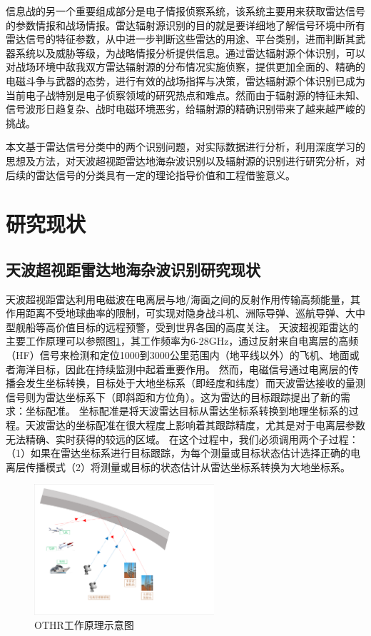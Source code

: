 信息战的另一个重要组成部分是电子情报侦察系统，该系统主要用来获取雷达信号的参数情报和战场情报。雷达辐射源识别的目的就是要详细地了解信号环境中所有雷达信号的特征参数，从中进一步判断这些雷达的用途、平台类别，进而判断其武器系统以及威胁等级，为战略情报分析提供信息。通过雷达辐射源个体识别，可以对战场环境中敌我双方雷达辐射源的分布情况实施侦察，提供更加全面的、精确的电磁斗争与武器的态势，进行有效的战场指挥与决策，雷达辐射源个体识别已成为当前电子战特别是电子侦察领域的研究热点和难点。然而由于辐射源的特征未知、信号波形日趋复杂、战时电磁环境恶劣，给辐射源的精确识别带来了越来越严峻的挑战。

本文基于雷达信号分类中的两个识别问题，对实际数据进行分析，利用深度学习的思想及方法，对天波超视距雷达地海杂波识别以及辐射源的识别进行研究分析，对后续的雷达信号的分类具有一定的理论指导价值和工程借鉴意义。

\section{研究现状}
\subsection{天波超视距雷达地海杂波识别研究现状}
天波超视距雷达利用电磁波在电离层与地/海面之间的反射作用传输高频能量，其作用距离不受地球曲率的限制，可实现对隐身战斗机、洲际导弹、巡航导弹、大中型舰船等高价值目标的远程预警，受到世界各国的高度关注。
天波超视距雷达的主要工作原理可以参照图\ref{fig:othr_how}，其工作频率为6-28GHz，通过反射来自电离层的高频（HF）信号来检测和定位1000到3000公里范围内（地平线以外）的飞机、地面或者海洋目标，因此在持续监测中起着重要作用。
然而，电磁信号通过电离层的传播会发生坐标转换，目标处于大地坐标系（即经度和纬度）而天波雷达接收的量测信号则为雷达坐标系下（即斜距和方位角）。这为雷达的目标跟踪提出了新的需求：坐标配准。
坐标配准是将天波雷达目标从雷达坐标系转换到地理坐标系的过程。天波雷达的坐标配准在很大程度上影响着其跟踪精度，尤其是对于电离层参数无法精确、实时获得的较远的区域。
在这个过程中，我们必须调用两个子过程：（1）如果在雷达坐标系进行目标跟踪，为每个测量或目标状态估计选择正确的电离层传播模式（2）将测量或目标的状态估计从雷达坐标系转换为大地坐标系。
\begin{figure}[hbt]
	\centering
	\includegraphics[width=6.67cm]{figures/introduction/othr_work_new}
	\caption{OTHR工作原理示意图}
	\label{fig:othr_how}
\end{figure}

